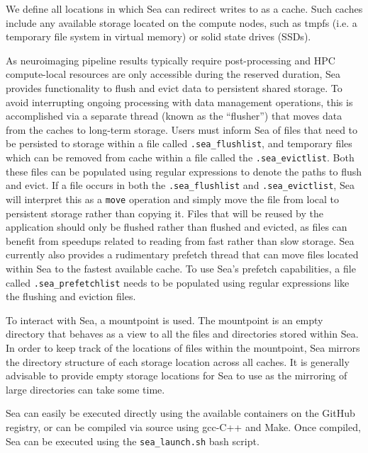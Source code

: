 \documentclass[fleqn,10pt]{wlscirep}
\begin{document}
    We define all locations in which Sea can redirect writes to as a cache. Such
    caches include any available storage located on the compute nodes, such as
    tmpfs (i.e. a temporary file system in virtual memory) or solid state drives (SSDs). 

    As neuroimaging pipeline results typically require post-processing and
    HPC compute-local resources are only accessible during the reserved
    duration, Sea provides functionality to flush and evict data to persistent
    shared storage. To avoid interrupting ongoing
    processing with data management operations, this is accomplished via a separate thread (known as the
    ``flusher'') that moves data from the caches to long-term storage. Users must inform Sea of files
    that need to be persisted to storage within a file called
    \texttt{.sea\_flushlist}, and temporary files which can be removed from
    cache within a file called the \texttt{.sea\_evictlist}. Both these files
    can be populated using regular expressions to denote the paths to flush and
    evict. If a file occurs in both the \texttt{.sea\_flushlist} and
    \texttt{.sea\_evictlist}, Sea will interpret this as a \texttt{move}
    operation and simply move the file from local to persistent storage rather
    than copying it. Files that will be reused by the application should only be
    flushed rather than flushed and evicted, as files can benefit from speedups
    related to reading from fast rather than slow storage. Sea currently also
    provides a rudimentary prefetch thread that can move files located within
    Sea to the fastest available cache. To use Sea's prefetch
    capabilities, a file called \texttt{.sea\_prefetchlist} needs to be
    populated using regular expressions like the flushing and eviction files.
    
    To interact with Sea, a mountpoint is used. The mountpoint
    is an empty directory that behaves as a view to all the files and
    directories stored within Sea. In order to keep track of the locations of
    files within the mountpoint, Sea mirrors the directory structure of each
    storage location across all caches. It is generally advisable to provide
    empty storage locations for Sea to use as the mirroring of large directories
    can take some time.
    
    Sea can easily be executed directly using the available containers on the
    GitHub registry, or can be compiled via source using gcc-C++ and Make. Once
    compiled, Sea can be executed using the \texttt{sea\_launch.sh} bash script.
\end{document}
